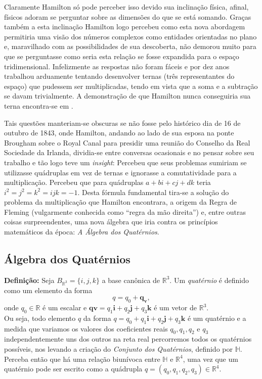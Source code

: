 \documentclass[a4paper,12pt]{article}
\begin{document}
	Claramente Hamilton só pode perceber isso devido sua inclinação física, afinal, físicos adoram se perguntar sobre as dimensões do que se está somando. Graças também a esta inclinação Hamilton logo percebeu como esta nova abordagem permitiria uma visão dos números complexos como entidades orientadas no plano e, maravilhado com as possibilidades de sua descoberta, não demorou muito para que se perguntasse como seria esta relação se fosse expandida para o espaço tridimensional. Infelizmente as respostas não foram fáceis e por dez anos trabalhou arduamente tentando desenvolver ternas (três representantes do espaço) que pudessem ser multiplicadas, tendo em vista que a soma e a subtração se davam trivialmente. A demonstração de que Hamilton nunca conseguiria sua terna encontra-se em \cite{QuaterniosJucineide}. 
	
	Tais questões manteriam-se obscuras se não fosse pelo histórico dia de 16 de outubro de 1843, onde Hamilton, andando ao lado de sua esposa na ponte Brougham sobre o Royal Canal para presidir uma reunião do Conselho da Real Sociedade da Irlanda, dividia-se entre conversas ocasionais e no pensar sobre seu trabalho e tão logo teve um \textit{insight}: Percebeu que seus problemas sumiriam se utilizasse quádruplas em vez de ternas e ignorasse a comutatividade para a multiplicação. Percebeu que para quádruplas $a + bi + cj + dk$ teria $i^2 = j^2 = k^2 = ijk = -1$. Desta fórmula fundamental tira-se a solução do problema da multiplicação que Hamilton encontrara, a origem da Regra de Fleming (vulgarmente conhecida como “regra da mão direita”) e, entre outras coisas surpreendentes, uma nova álgebra que iria contra os princípios matemáticos da época: \textit{A Álgebra dos Quatérnios}.
	
	\subsection{Álgebra dos Quatérnios}
	\textbf{Definição: }Seja $B_{\mathbb{R}^3}=\{i,j,k\}$ a base canônica de $\mathbb{R}^3$. Um \textit{quatérnio} é definido como um elemento da forma 
	\begin{equation}
	q=q_0+\mathbf{q_v},
	\end{equation} 
	onde $q_0 \in \mathbb{R}$ é um escalar e $\mathbf{qv}=q_1\mathbf{i}+q_2\mathbf{j}+q_3\mathbf{k}$ é um vetor de $\mathbb{R}^3$.
	\\
	
	Ou seja, todo elemento $q$ da forma $q = q_0 + q_1\textbf{i} + q_2\textbf{j} + q_3\textbf{k}$ é um quatérnio e a medida que variamos os valores dos coeficientes reais $q_0, q_1, q_2$ e $q_3$ independentemente uns dos outros na reta real percorremos todos os quatérnios possíveis, nos levando a criação do \textit{Conjunto dos Quatérnios}, definido por $\mathbb{H}$. Perceba então que há uma relação biunívoca entre $\mathbb{H}$ e $\mathbb{R}^4$, uma vez que um quatérnio pode ser escrito como a quádrupla $q = (q_0, q_1, q_2, q_3) \in \mathbb{R}^4$. \cite{fidalgotese}
	\\
	
\end{document}
